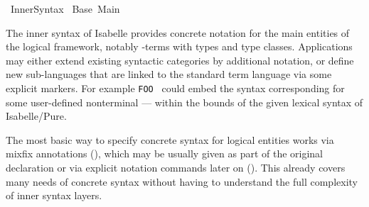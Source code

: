 %
\begin{isabellebody}%
\def\isabellecontext{Inner{\isaliteral{5F}{\isacharunderscore}}Syntax}%
%
\isadelimtheory
%
\endisadelimtheory
%
\isatagtheory
{}\isamarkupfalse%
\ Inner{}Syntax\isanewline
{}\ Base\ Main\isanewline
{}%
\endisatagtheory
{\isafoldtheory}%
%
\isadelimtheory
%
\endisadelimtheory
%
\isamarkuptrue%
%
\begin{isamarkuptext}%
The inner syntax of Isabelle provides concrete notation for
  the main entities of the logical framework, notably -terms with types and type classes.  Applications may either
  extend existing syntactic categories by additional notation, or
  define new sub-languages that are linked to the standard term
  language via some explicit markers.  For example \verb|FOO|~ could embed the syntax corresponding for some
  user-defined nonterminal  --- within the bounds of the
  given lexical syntax of Isabelle/Pure.

  The most basic way to specify concrete syntax for logical entities
  works via mixfix annotations (), which may be
  usually given as part of the original declaration or via explicit
  notation commands later on ().  This already
  covers many needs of concrete syntax without having to understand
  the full complexity of inner syntax layers.


\end{isamarkuptext}
\end{isabellebody}
